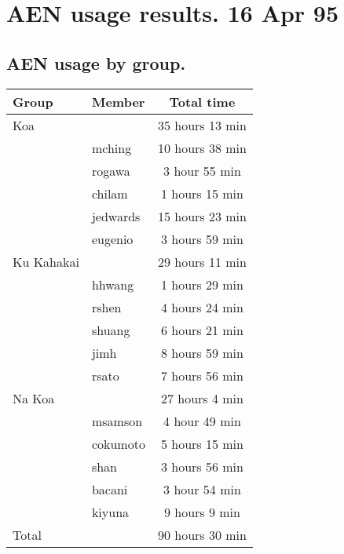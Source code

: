 







\chapter{AEN usage results. 16 Apr 95}
\section{AEN usage by group.}
\begin{tabular}{|l|l|c|}
\hline
Group&Member&Total time\\
\hline
\hline
Koa&&35 hours 13 min\\
\hline
&mching&10 hours 38 min\\
&rogawa&3 hour 55 min\\
&chilam&1 hours 15 min\\
&jedwards&15 hours 23 min\\
&eugenio&3 hours 59 min\\
\hline
\hline
Ku Kahakai&&29 hours 11 min\\
\hline
&hhwang&1 hours 29 min\\
&rshen&4 hours 24 min\\
&shuang&6 hours 21 min\\
&jimh&8 hours 59 min\\
&rsato&7 hours 56 min\\
\hline
\hline
Na Koa&&27 hours 4 min\\
\hline
&msamson&4 hour 49 min\\
&cokumoto&5 hours 15 min\\
&shan&3 hours 56 min\\
&bacani&3 hour 54 min\\
&kiyuna&9 hours 9 min\\
\hline
\hline
Total&&90 hours 30 min\\
\hline
\end{tabular} \\

